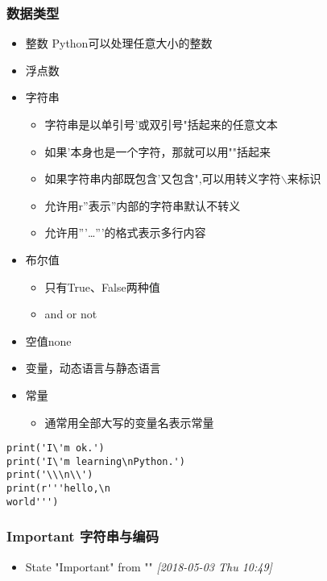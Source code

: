 \documentclass[11pt]{article}
\begin{document}
\subsubsection{数据类型}
\label{sec:orgdb0935a}
\begin{itemize}
\item 整数
Python可以处理任意大小的整数
\item 浮点数
\item 字符串
\begin{itemize}
\item 字符串是以单引号'或双引号"括起来的任意文本
\item 如果'本身也是一个字符，那就可以用""括起来
\item 如果字符串内部既包含'又包含",可以用转义字符$\backslash$来标识
\item 允许用r''表示''内部的字符串默认不转义
\item 允许用'''\ldots{}'''的格式表示多行内容
\end{itemize}
\item 布尔值
\begin{itemize}
\item 只有True、False两种值
\item and or not
\end{itemize}
\item 空值none
\item 变量，动态语言与静态语言
\item 常量
\begin{itemize}
\item 通常用全部大写的变量名表示常量
\end{itemize}
\end{itemize}
\begin{verbatim}
print('I\'m ok.')
print('I\'m learning\nPython.')
print('\\\n\\')
print(r'''hello,\n
world''')
\end{verbatim}
\subsubsection{{\bfseries\sffamily Important} 字符串与编码}
\label{sec:orgeb048d4}
\begin{itemize}
\item State "Important"  from ""           \textit{[2018-05-03 Thu 10:49]}
\end{itemize}
\end{document}
